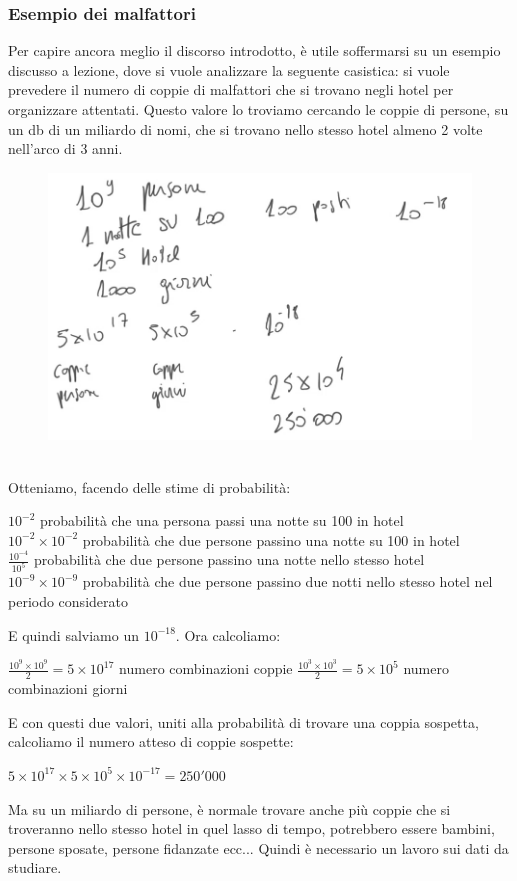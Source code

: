 \subsubsection{Esempio dei malfattori}
Per capire ancora meglio il discorso introdotto, è utile soffermarsi su un esempio discusso a lezione, dove si vuole analizzare la seguente casistica: si vuole prevedere il numero di coppie di malfattori che si trovano negli hotel per organizzare attentati. Questo valore lo troviamo cercando le coppie di persone, su un db di un miliardo di nomi, che si trovano nello stesso hotel almeno 2 volte nell'arco di 3 anni. 
\\
\begin{figure}[th]
    \centering
    \includegraphics[scale=0.35]{ML/img/Example.png}
    \label{fig:examplex}
\end{figure}
\\
Otteniamo, facendo delle stime di probabilità:
\begin{center}
     $10^{-2}$ probabilità che una persona passi una notte su 100 in hotel
\\[2ex]
    $10^{-2} \times 10^{-2}$ probabilità che due persone passino una notte su 100 in hotel
\\[2ex]
    $\frac{10^{-4}}{10^{5}}$ probabilità che due persone passino una notte nello stesso hotel
\\[2ex]
    $10^{-9} \times 10^{-9}$ probabilità che due persone passino due notti nello stesso hotel nel periodo considerato
\end{center}
E quindi salviamo un $10^{-18}$. Ora calcoliamo: 
\begin{center}
    $\frac{10^9 \times 10^9}{2} = 5 \times 10^17$ numero combinazioni coppie
    $\frac{10^3 \times 10^3}{2} = 5 \times 10^5$ numero combinazioni giorni
\end{center}
E con questi due valori, uniti alla probabilità di trovare una coppia sospetta, calcoliamo il numero atteso di coppie sospette: 
\begin{center}
    $5 \times 10^17 \times 5 \times 10^5 \times 10^{-17} = 250'000$
\end{center}
Ma su un miliardo di persone, è normale trovare anche più coppie che si troveranno nello stesso hotel in quel lasso di tempo, potrebbero essere bambini, persone sposate, persone fidanzate ecc... Quindi è necessario un lavoro sui dati da studiare.

